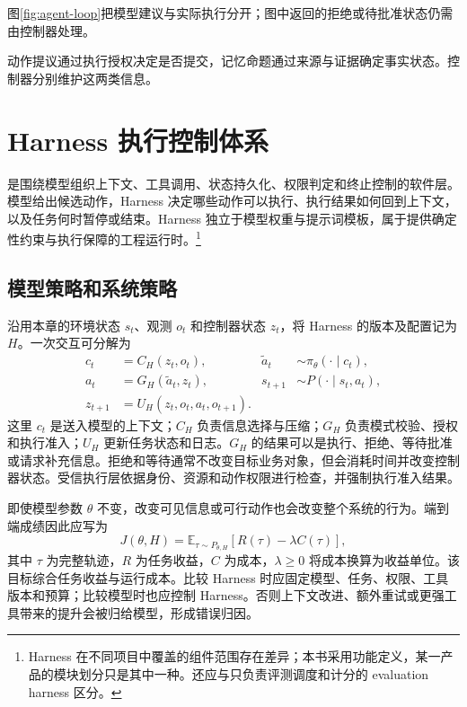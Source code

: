 \documentclass[../textbook.tex]{subfiles}
\begin{document}
图\ref{fig:agent-loop}把模型建议与实际执行分开；图中返回的拒绝或待批准状态仍需由控制器处理。

\begin{note}[动作授权与记忆存证的双重控制边界]
动作提议通过执行授权决定是否提交，记忆命题通过来源与证据确定事实状态。控制器分别维护这两类信息。
\end{note}

\section{Harness 执行控制体系}

\label{sec:agent-harness}
是围绕模型组织上下文、工具调用、状态持久化、权限判定和终止控制的软件层。模型给出候选动作，Harness 决定哪些动作可以执行、执行结果如何回到上下文，以及任务何时暂停或结束。Harness 独立于模型权重与提示词模板，属于提供确定性约束与执行保障的工程运行时。\footnote{Harness 在不同项目中覆盖的组件范围存在差异；本书采用功能定义，某一产品的模块划分只是其中一种。还应与只负责评测调度和计分的 evaluation harness 区分。}

\subsection{模型策略和系统策略}
沿用本章的环境状态 $s_t$、观测 $o_t$ 和控制器状态 $z_t$，将 Harness 的版本及配置记为 $H$。一次交互可分解为
\begin{align}
 c_t&=C_H(z_t,o_t), & \widetilde a_t&\sim\pi_\theta(\cdot\mid c_t),\\
 a_t&=G_H(\widetilde a_t,z_t), & s_{t+1}&\sim P(\cdot\mid s_t,a_t),\\
 z_{t+1}&=U_H(z_t,o_t,a_t,o_{t+1}).
\end{align}
这里 $c_t$ 是送入模型的上下文；$C_H$ 负责信息选择与压缩；$G_H$ 负责模式校验、授权和执行准入；$U_H$ 更新任务状态和日志。$G_H$ 的结果可以是执行、拒绝、等待批准或请求补充信息。拒绝和等待通常不改变目标业务对象，但会消耗时间并改变控制器状态。受信执行层依据身份、资源和动作权限进行检查，并强制执行准入结果。

即使模型参数 $\theta$ 不变，改变可见信息或可行动作也会改变整个系统的行为。端到端成绩因此应写为
\begin{equation}
 J(\theta,H)=\mathbb E_{\tau\sim P_{\theta,H}}
 \left[R(\tau)-\lambda C(\tau)\right],
\end{equation}
其中 $\tau$ 为完整轨迹，$R$ 为任务收益，$C$ 为成本，$\lambda\ge0$ 将成本换算为收益单位。该目标综合任务收益与运行成本。比较 Harness 时应固定模型、任务、权限、工具版本和预算；比较模型时也应控制 Harness。否则上下文改进、额外重试或更强工具带来的提升会被归给模型，形成错误归因。
\end{document}
